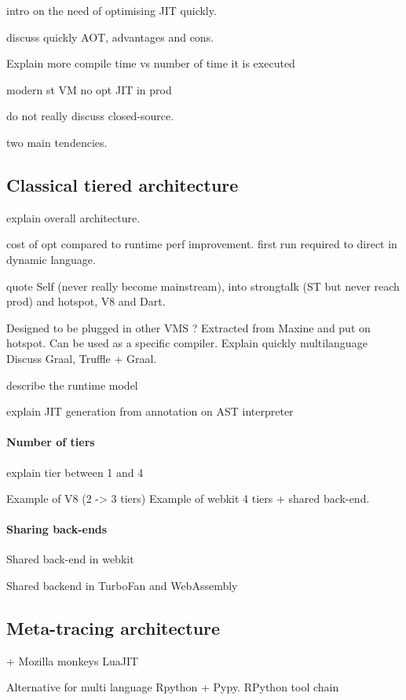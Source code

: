 \documentclass[a4paper,12pt,twoside]{../includes/ThesisStyle}
\begin{document}
intro on the need of optimising JIT quickly. 

discuss quickly AOT, advantages and cons.

Explain more compile time vs number of time it is executed

modern st VM no opt JIT in prod

do not really discuss closed-source.

two main tendencies.

\subsection{Classical tiered architecture}

explain overall architecture.

cost of opt compared to runtime perf improvement.
first run required to direct in dynamic language.

quote Self (never really become mainstream), into strongtalk (ST but never reach prod) and hotspot, V8 and Dart. 

Designed to be plugged in other VMS ? Extracted from Maxine and put on hotspot. Can be used as a specific compiler.
Explain quickly multilanguage
Discuss Graal, Truffle + Graal.

describe the runtime model

explain JIT generation from annotation on AST interpreter

\paragraph{Number of tiers}

explain tier between 1 and 4

Example of V8 (2 -> 3 tiers)
Example of webkit 4 tiers + shared back-end.

\paragraph{Sharing back-ends}

Shared back-end in webkit 

Shared backend in TurboFan and WebAssembly


\subsection{Meta-tracing architecture}

+ Mozilla monkeys
LuaJIT

Alternative for multi language
Rpython + Pypy.
RPython tool chain \cite{Rigo06a}
\end{document}
